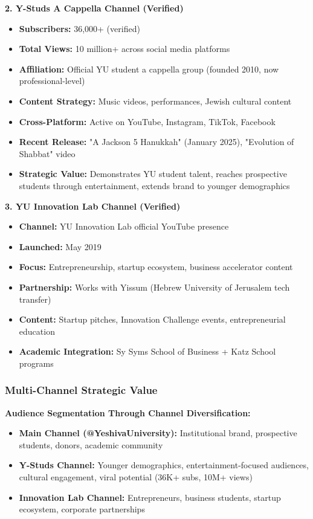 \documentclass[12pt,letterpaper]{article}
\begin{document}
\textbf{2. Y-Studs A Cappella Channel (Verified)}
\begin{itemize}[leftmargin=*]
    \item \textbf{Subscribers:} 36,000+ (verified)
    \item \textbf{Total Views:} 10 million+ across social media platforms
    \item \textbf{Affiliation:} Official YU student a cappella group (founded 2010, now professional-level)
    \item \textbf{Content Strategy:} Music videos, performances, Jewish cultural content
    \item \textbf{Cross-Platform:} Active on YouTube, Instagram, TikTok, Facebook
    \item \textbf{Recent Release:} "A Jackson 5 Hanukkah" (January 2025), "Evolution of Shabbat" video
    \item \textbf{Strategic Value:} Demonstrates YU student talent, reaches prospective students through entertainment, extends brand to younger demographics
\end{itemize}

\textbf{3. YU Innovation Lab Channel (Verified)}
\begin{itemize}[leftmargin=*]
    \item \textbf{Channel:} YU Innovation Lab official YouTube presence
    \item \textbf{Launched:} May 2019
    \item \textbf{Focus:} Entrepreneurship, startup ecosystem, business accelerator content
    \item \textbf{Partnership:} Works with Yissum (Hebrew University of Jerusalem tech transfer)
    \item \textbf{Content:} Startup pitches, Innovation Challenge events, entrepreneurial education
    \item \textbf{Academic Integration:} Sy Syms School of Business + Katz School programs
\end{itemize}

\subsubsection{Multi-Channel Strategic Value}

\textbf{Audience Segmentation Through Channel Diversification:}
\begin{itemize}[leftmargin=*]
    \item \textbf{Main Channel (@YeshivaUniversity):} Institutional brand, prospective students, donors, academic community
    \item \textbf{Y-Studs Channel:} Younger demographics, entertainment-focused audiences, cultural engagement, viral potential (36K+ subs, 10M+ views)
    \item \textbf{Innovation Lab Channel:} Entrepreneurs, business students, startup ecosystem, corporate partnerships
\end{itemize}
\end{document}
